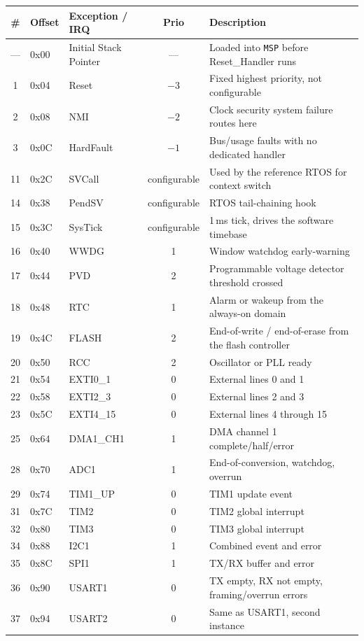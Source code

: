 \documentclass[11pt,a4paper,parskip=half]{scrartcl}
\begin{document}
\begin{center}
\small
\begin{tabularx}{\textwidth}{@{}c l l c Y@{}}
\toprule
\textbf{\#} & \textbf{Offset} & \textbf{Exception / IRQ} & \textbf{Prio} & \textbf{Description} \\
\midrule
--- & 0x00 & Initial Stack Pointer & --- & Loaded into \texttt{MSP} before Reset\_Handler runs \\
1 & 0x04 & Reset & $-3$ & Fixed highest priority, not configurable \\
2 & 0x08 & NMI & $-2$ & Clock security system failure routes here \\
3 & 0x0C & HardFault & $-1$ & Bus/usage faults with no dedicated handler \\
11 & 0x2C & SVCall & configurable & Used by the reference RTOS for context switch \\
14 & 0x38 & PendSV & configurable & RTOS tail-chaining hook \\
15 & 0x3C & SysTick & configurable & 1\,ms tick, drives the software timebase \\
16 & 0x40 & WWDG & 1 & Window watchdog early-warning \\
17 & 0x44 & PVD & 2 & Programmable voltage detector threshold crossed \\
18 & 0x48 & RTC & 1 & Alarm or wakeup from the always-on domain \\
19 & 0x4C & FLASH & 2 & End-of-write / end-of-erase from the flash controller \\
20 & 0x50 & RCC & 2 & Oscillator or PLL ready \\
21 & 0x54 & EXTI0\_1 & 0 & External lines 0 and 1 \\
22 & 0x58 & EXTI2\_3 & 0 & External lines 2 and 3 \\
23 & 0x5C & EXTI4\_15 & 0 & External lines 4 through 15 \\
25 & 0x64 & DMA1\_CH1 & 1 & DMA channel 1 complete/half/error \\
28 & 0x70 & ADC1 & 1 & End-of-conversion, watchdog, overrun \\
29 & 0x74 & TIM1\_UP & 0 & TIM1 update event \\
31 & 0x7C & TIM2 & 0 & TIM2 global interrupt \\
32 & 0x80 & TIM3 & 0 & TIM3 global interrupt \\
34 & 0x88 & I2C1 & 1 & Combined event and error \\
35 & 0x8C & SPI1 & 1 & TX/RX buffer and error \\
36 & 0x90 & USART1 & 0 & TX empty, RX not empty, framing/overrun errors \\
37 & 0x94 & USART2 & 0 & Same as USART1, second instance \\
\bottomrule
\end{tabularx}
\end{center}
\end{document}
